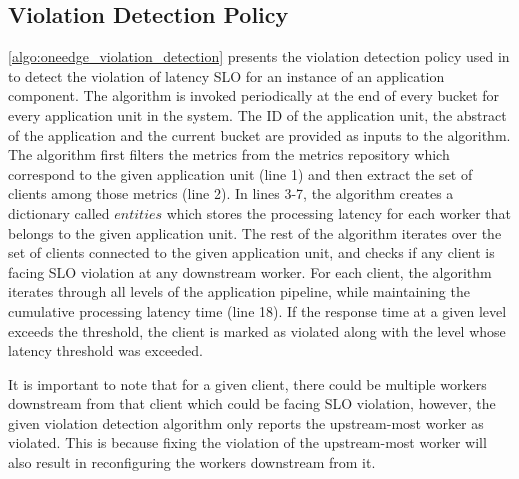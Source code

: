 \subsection{Violation Detection Policy}
\cref{algo:oneedge_violation_detection} presents the violation detection policy used in \oneedge{} to detect the violation of latency SLO for an instance of an application component. The algorithm is invoked periodically at the end of every bucket for every application unit in the system. The ID of the application unit, the abstract of the application and the current bucket are provided as inputs to the algorithm. The algorithm first filters the metrics from the metrics repository which correspond to the given application unit (line 1) and then extract the set of clients among those metrics (line 2). In lines 3-7, the algorithm creates a dictionary called $entities$ which stores the processing latency for each worker that belongs to the given application unit. The rest of the algorithm iterates over the set of clients connected to the given application unit, and checks if any client is facing SLO violation at any downstream worker. For each client, the algorithm iterates through all levels of the application pipeline, while maintaining the cumulative processing latency time (line 18). If the response time at a given level exceeds the threshold, the client is marked as violated along with the level whose latency threshold was exceeded.
\par It is important to note that for a given client, there could be multiple workers downstream from that client which could be facing SLO violation, however, the given violation detection algorithm only reports the upstream-most worker as violated. This is because fixing the violation of the upstream-most worker will also result in reconfiguring the workers downstream from it.
